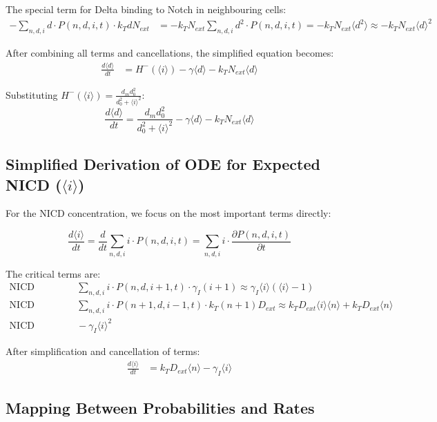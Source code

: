 \documentclass{article}
\begin{document}
\begin{flushleft}
The special term for Delta binding to Notch in neighbouring cells:
\begin{align*}
-\sum_{n,d,i} d \cdot P(n,d,i,t) \cdot k_T d N_{ext} &= -k_T N_{ext} \sum_{n,d,i} d^2 \cdot P(n,d,i,t) = -k_T N_{ext} \langle d^2 \rangle \approx -k_T N_{ext} \langle d \rangle^2
\end{align*}

After combining all terms and cancellations, the simplified equation becomes:
\begin{align*}
\frac{d\langle d \rangle}{dt} &= H^-(\langle i \rangle) - \gamma \langle d \rangle - k_T N_{ext} \langle d \rangle
\end{align*}

Substituting $H^-(\langle i \rangle)=\frac{d_m d_0^2}{d_0^2 + \langle i \rangle^2}$:
$$\frac{d\langle d \rangle}{dt} = \frac{d_m d_0^2}{d_0^2 + \langle i \rangle^2} - \gamma \langle d \rangle - k_T N_{ext} \langle d \rangle$$

\subsection*{Simplified Derivation of ODE for Expected NICD ($\langle i \rangle$)}

For the NICD concentration, we focus on the most important terms directly:

$$\frac{d\langle i \rangle}{dt} = \frac{d}{dt}\sum_{n,d,i} i \cdot P(n,d,i,t) = \sum_{n,d,i} i \cdot \frac{\partial P(n,d,i,t)}{\partial t}$$

The critical terms are:
\begin{align*}
\text{NICD decay:} &\quad \sum_{n,d,i} i \cdot P(n,d,i+1,t) \cdot \gamma_I(i+1) \approx \gamma_I \langle i \rangle (\langle i \rangle - 1) \\
\text{NICD production:} &\quad \sum_{n,d,i} i \cdot P(n+1,d,i-1,t) \cdot k_T(n+1)D_{ext} \approx k_T D_{ext} \langle i \rangle \langle n \rangle + k_T D_{ext} \langle n \rangle \\
\text{NICD degradation term:} &\quad -\gamma_I \langle i \rangle^2
\end{align*}

After simplification and cancellation of terms:
\begin{align*}
\frac{d\langle i \rangle}{dt} &= k_T D_{ext} \langle n \rangle - \gamma_I \langle i \rangle
\end{align*}

\subsection*{Mapping Between Probabilities and Rates}


\end{flushleft}
\end{document}
